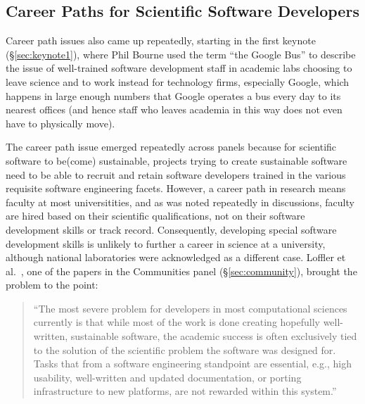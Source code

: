 \documentclass[11pt, oneside]{amsart}
\newcommand{\note}[1]{ {\textcolor{red}    { #1 }}}
\begin{document}
\subsection{Career Paths for Scientific Software Developers}\label{sec:career-tracks} %

Career path issues also came up repeatedly, starting in the first
keynote (\S\ref{sec:keynote1}), where Phil Bourne used the term ``the
Google Bus'' to describe the issue of well-trained software development staff in
academic labs choosing to leave science and to work instead for technology
firms, especially Google, which happens in large enough numbers that
Google operates a bus every day to its nearest offices (and hence
staff who leaves academia in this way does not even have  to physically move).

The career path issue emerged repeatedly across panels because for
scientific software to be(come) sustainable, projects trying to create
sustainable software need to be able to recruit and retain software
developers trained in the various requisite software engineering
facets.  However, a career path in research means faculty at most
universitities, and as was noted repeatedly in discussions, faculty
are hired based on their scientific qualifications, not on their
software development skills or track record. Consequently, developing
special software development skills is unlikely to further a career in
science at a university, although national laboratories were
acknowledged as a different case. Loffler et
al.~\cite{Loffler_WSSSPE}, one of the papers in the Communities panel
(\S\ref{sec:community}), brought the problem to the point:
\begin{quote}
  ``The most severe problem for developers in most computational
  sciences currently is that while most of the work is done creating
  hopefully well-written, sustainable software, the academic success
  is often exclusively tied to the solution of the scientific problem
  the software was designed for. Tasks that from a software
  engineering standpoint are essential, e.g., high usability,
  well-written and updated documentation, or porting infrastructure to
  new platforms, are not rewarded within this system.'' ~\cite{Loffler_WSSSPE}
\end{quote}
\end{document}
